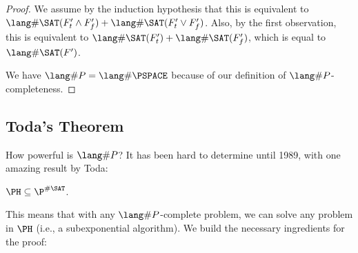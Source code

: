 \begin{proof}
\par We assume by the induction hypothesis that this is equivalent to $\SharpSAT(F'_t \wedge F'_f) + \SharpSAT(F'_t \vee F'_f)$. Also, by the first observation, this is equivalent to $\SharpSAT(F'_t) + \SharpSAT(F'_f)$, which is equal to $\SharpSAT(F')$. 

\par We have $\SharpP = \SharpPSPACE$ because of our definition of $\SharpP$-completeness. 

%
%
%
\end{proof}

\subsection{Toda's Theorem}
How powerful is $\SharpP$? It has been hard to determine until 1989, with one amazing result by Toda:
\begin{theorem}
$\PH \subseteq \P^{\#\SAT}$. 
\end{theorem}
This means that with any $\SharpP$-complete problem, we can solve any problem in $\PH$ (i.e., a subexponential algorithm). We build the necessary ingredients for the proof:

